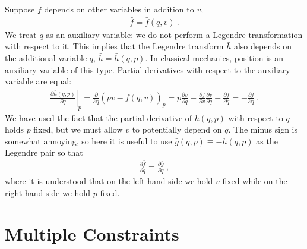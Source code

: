 Suppose $\bar f$ depends on other variables in addition to $v$, 
\begin{align}
    \bar f = \bar f(q,v) \ .
\end{align}
We treat $q$ as an auxiliary variable: we do not perform a Legendre transformation with respect to it. This implies that the Legendre transform $\bar h$ also depends on the additional variable $q$, $\bar h = \bar h(q,p)$. In classical mechanics, position is an auxiliary variable of this type. Partial derivatives with respect to the auxiliary variable are equal:
\begin{align}
    \left.\frac{\partial \bar h(q,p)}{\partial q}\right|_{p}
    =
    \frac{\partial}{\partial q}\left(pv - \bar f(q,v)\right)_{p}
    =
    p\frac{\partial v}{\partial q}
    -
    \frac{\partial \bar f}{\partial v}
    \frac{\partial v}{\partial q}
    -
    \frac{\partial \bar f}{\partial q}
    =
    -\frac{\partial \bar f}{\partial q} \ .
    \label{eq:auxiliary:variable:derivatives}
\end{align}
We have used the fact that the partial derivative of $\bar h(q,p)$ with respect to $q$ holds $p$ fixed, but we must allow $v$ to potentially depend on $q$. The minus sign is somewhat annoying, so here it is useful to use $\bar g(q,p) \equiv -\bar h(q,p)$ as the Legendre pair so that
\begin{align}
    \frac{\partial \bar f}{\partial q}
    = 
    \frac{\partial \bar g}{\partial q} \ ,
\end{align}
where it is understood that on the left-hand side we hold $v$ fixed while on the right-hand side we hold $p$ fixed.


\section{Multiple Constraints}

